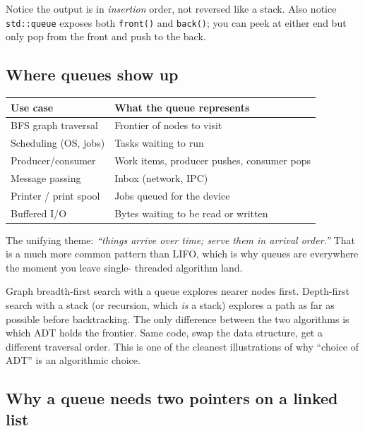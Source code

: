 \documentclass[11pt]{article}
\begin{document}
Notice the output is in \emph{insertion} order, not reversed like
a stack. Also notice \texttt{std::queue} exposes both
\texttt{front()} and \texttt{back()}; you can peek at either end
but only pop from the front and push to the back.

\subsection*{Where queues show up}

\begin{center}
\begin{tabular}{|l|l|}
\hline
\textbf{Use case} & \textbf{What the queue represents} \\
\hline
BFS graph traversal   & Frontier of nodes to visit \\
Scheduling (OS, jobs) & Tasks waiting to run \\
Producer/consumer     & Work items, producer pushes, consumer pops \\
Message passing       & Inbox (network, IPC) \\
Printer / print spool & Jobs queued for the device \\
Buffered I/O          & Bytes waiting to be read or written \\
\hline
\end{tabular}
\end{center}

The unifying theme: \emph{``things arrive over time; serve them
in arrival order.''} That is a much more common pattern than LIFO,
which is why queues are everywhere the moment you leave single-
threaded algorithm land.

\begin{notebox}
Graph breadth-first search with a queue explores nearer nodes
first. Depth-first search with a stack (or recursion, which
\emph{is} a stack) explores a path as far as possible before
backtracking. The only difference between the two algorithms is
which ADT holds the frontier. Same code, swap the data structure,
get a different traversal order. This is one of the cleanest
illustrations of why ``choice of ADT'' is an algorithmic choice.
\end{notebox}

\subsection*{Why a queue needs two pointers on a linked list}
\end{document}
